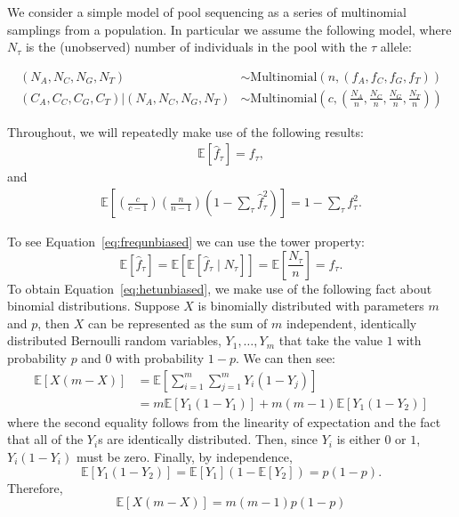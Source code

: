 \documentclass[a4paper,fontsize=9pt,DIV=14]{scrartcl}
\newcommand{\samplesize}{n}
\newcommand{\coverage}{c}
\newcommand{\empfreq}{\widehat{f}}
\begin{document}
We consider a simple model of pool sequencing as a series of multinomial samplings from a population.  In particular we assume the following model, where $N_\tau$ is the (unobserved) number of individuals in the pool with the $\tau$ allele:

\begin{align*}
(N_A, N_C, N_G, N_T) &\sim \text{Multinomial}\left(\samplesize, (f_A, f_C, f_G, f_T)\right)\\
(C_A, C_C, C_G, C_T) | (N_A, N_C, N_G, N_T) &\sim \text{Multinomial}\left(\coverage, \left(\frac{N_A}{\samplesize}, \frac{N_C}{\samplesize},\frac{N_G}{\samplesize},\frac{N_T}{\samplesize}\right)\right)
\end{align*}

Throughout, we will repeatedly make use of the following results:
\begin{align}
\mathbb{E}\left[\empfreq_\tau\right] = f_\tau, \label{eq:frequnbiased}
\end{align}
and
\begin{align}
\mathbb{E}\left[\left(\frac{\coverage}{\coverage-1}\right)\left(\frac{\samplesize}{\samplesize-1}\right)\left(1-\sum_\tau\empfreq_\tau^2\right)\right] = 1-\sum_\tau f_\tau^2. \label{eq:hetunbiased}
\end{align}

To see Equation~\ref{eq:frequnbiased} we can use the tower property:
\[
\mathbb{E}\left[\empfreq_\tau\right] = \mathbb{E}\left[\mathbb{E}\left[\empfreq_\tau \mid N_\tau \right]\right] = \mathbb{E}\left[\frac{N_\tau}{n}\right] = f_\tau.
\]
To obtain Equation~\ref{eq:hetunbiased}, we make use of the following fact about binomial distributions.  Suppose $X$ is binomially distributed with parameters $m$ and $p$, then $X$ can be represented as the sum of $m$ independent, identically distributed Bernoulli random variables, $Y_1,\ldots,Y_m$ that take the value $1$ with probability $p$ and $0$ with probability $1-p$.  We can then see:
\begin{align*}
\mathbb{E}\left[X(m-X)\right] &= \mathbb{E}\left[\sum_{i=1}^m\sum_{j=1}^mY_i(1-Y_j)\right]\\
&= m\mathbb{E}\left[Y_1(1-Y_1)\right] + m(m-1)\mathbb{E}\left[Y_1(1-Y_2)\right]
\end{align*}
where the second equality follows from the linearity of expectation and the fact that all of the $Y_i$s are identically distributed.  Then, since $Y_i$ is either $0$ or $1$, $Y_i(1-Y_i)$ must be zero.  Finally, by independence,
\[
\mathbb{E}\left[Y_1(1-Y_2)\right] = \mathbb{E}\left[Y_1\right]\left(1-\mathbb{E}\left[Y_2\right]\right) = p(1-p).
\]
Therefore,
\[
\mathbb{E}\left[X(m-X)\right]  = m(m-1)p(1-p)
\]
\end{document}
